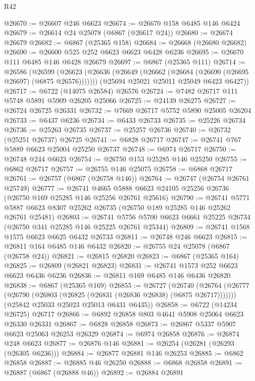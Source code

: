 \begin{lexlean}{R42}
\begin{coremodule}
{@26670 := @26607 @246 @6623
@26674 := @26670 @158 @6485 @146 @6424
@26679 := @26614 @24 @25078 (@6867 (@26617 @24))
@26680 := @26674 @26679
@26682 := @6867 (@25365 @158)
@26684 := @26668 (@26680 @26682)
@26690 := @26600 @525 @252 @6623 @6623 @6428 @6236
@26695 := @26670 @111 @6485 @146 @6428 @26679
@26697 := @6867 (@25365 @111)
@26714 := @26586
    (@26599
      (@26623 (@26636 (@26649 (@26662 (@26684 (@26690 (@26695 @26697) (@6875 @26576)))))))
      (@25694 @25021 @25011 @25049 @6423 @6427))
@26717 := @6722 (@14075 @26584) @26576
@26724 := @7482 @26717 @111 @5748 @5891 @5909 @26205 @25066
@26725 := @24139 @26275
@26727 := @26724 @26725 @26331
@26732 := @7669 @26717 @5752 @5890 @25005 @26204
@26733 := @6437 @6236
@26734 := @6433 @26733
@26735 := @25226 @26734
@26736 := @25263 @26735
@26737 := @25257 @26736
@26740 := @26732 (@25251 @26737) @26725
@26741 := @6828 @26717
@26747 := @26741 @767 @5889 @6623 @25004 @25250 @26737
@26748 := @6974 @26717
@26750 := @26748 @244 @6623
@26754 := @26750 @153 @25285 @146 @25250
@26755 := @6862 @26717
@26757 := @26755 @146 @25075
@26758 := @6868 @26717
@26761 := @26757 (@6867 (@26758 @146))
@26764 := @26747 (@26754 @26761 @25749)
@26777 := @26741
    @4665
    @5888
    @6623
    @24105
    @25256
    @26736
    (@26750 @169 @25285 @146 @25256 @26761 @25616)
@26790 := @26741
    @5771
    @5887
    @6623
    @8307
    @25262
    @26735
    (@26750 @189 @25285 @146 @25262 @26761 @25481)
@26803 := @26741
    @5756
    @5700
    @6623
    @6661
    @25225
    @26734
    (@26750 @341 @25285 @146 @25225 @26761 @25344)
@26809 := @26741 @1568 @1575 @6623 @6625 @6432 @26733
@26811 := @26748 @246 @6623
@26815 := @26811 @164 @6485 @146 @6432
@26820 := @26755 @24 @25078 (@6867 (@26758 @24))
@26821 := @26815 @26820
@26823 := @6867 (@25365 @164)
@26825 := @26809 (@26821 @26823)
@26831 := @26741 @1573 @252 @6623 @6623 @6436 @6236
@26836 := @26811 @169 @6485 @146 @6436 @26820
@26838 := @6867 (@25365 @169)
@26855 := @26727
    (@26740
      (@26764 (@26777 (@26790 (@26803 (@26825 (@26831 (@26836 @26838) (@6875 @26717)))))))
      (@25842 @25033 @25023 @25013 @6431 @6435))
@26858 := @6722 (@14234 @26725) @26717
@26866 := @6892 @26858 @803 @4641 @5908 @25064 @6623 @26330 @26331
@26867 := @6828 @26858
@26873 := @26867 @5337 @5907 @6623 @25063 @26253 @26329
@26874 := @6974 @26858
@26876 := @26874 @248 @6623
@26877 := @26876 @146
@26881 := @26254 (@26281 (@26293 (@26305 @6236)))
@26884 := @26877 @26881 @146 @26253
@26885 := @6862 @26858
@26887 := @26885 @46 @26250
@26888 := @6868 @26858
@26891 := @26887 (@6867 (@26888 @46))
@26892 := @26884 @26891
}
\end{coremodule}
\end{lexlean}
